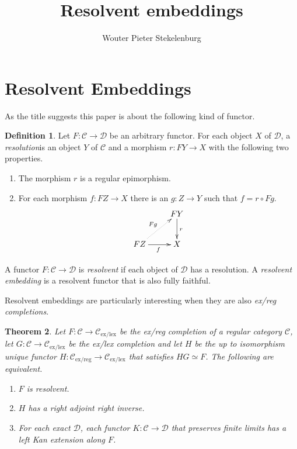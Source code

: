 \documentclass[sort&compress]{elsarticle}
\theoremstyle{plain}
\newtheorem{theorem}{Theorem}
\theoremstyle{definition}
\newtheorem{definition}[theorem]{Definition}
\theoremstyle{remark}
\newcommand\hide[1]{}
\newcommand\key[1]{\emph{#1}\label{#1}}
\newcommand\cat\mathcal
\newcommand\exlex{_\mathrm{ex/lex}}\newcommand\exreg{_\mathrm{ex/reg}}
\newcommand\of:
\begin{document}
\begin{frontmatter}
\title{Resolvent embeddings}

\author[W. P. Stekelenburg]{Wouter Pieter Stekelenburg}
\address{Faculty of Mathematics, Informatics and Mechanics,
University of Warsaw,
Banacha 2,
02-097 Warszawa,
Poland}

\begin{abstract}
\end{abstract}

\begin{keyword}
\end{keyword}


\end{frontmatter}


\section{Resolvent Embeddings}
As the title suggests this paper is about the following kind of functor.

\begin{definition} Let $F\of \cat C\to\cat D$ be an arbitrary functor. For each object $X$ of $\cat D$, a \key{resolution} is an object $Y$ of $\cat C$ and a morphism $r\of FY \to X$ with the following two properties.
\begin{enumerate} 
\item The morphism $r$ is a regular epimorphism.
\item For each morphism $f\of FZ\to X$ there is an $g\of Z\to Y$ such that $f=r\circ Fg$. 
\[ \xymatrix{
& FY \ar[d]^{r} \\
FZ\ar[r]_f \ar@{.>}[ur]^{Fg} & X
}\]
\end{enumerate}
A functor $F:\cat C\to\cat D$ is \key{resolvent} if each object of $\cat D$ has a resolution. A \emph{resolvent embedding} is a resolvent functor that is also fully faithful.
\end{definition}

Resolvent embeddings are particularly interesting when they are also \emph{ex/reg completions}.\hide{Clarify that we are talking about the functors and why.}

\begin{theorem} Let $F:\cat C\to\cat C\exlex$ be the ex/reg completion of a regular category $\cat C$, let $G\of \cat C \to \cat C\exlex$ be the ex/lex completion and let $H$ be the up to isomorphism unique functor $H\of\cat C\exreg \to \cat C\exlex$ that satisfies $HG\simeq F$. 
The following are equivalent.
\begin{enumerate}
\item $F$ is resolvent.
\item $H$ has a right adjoint right inverse.
\item For each exact $\cat D$, each functor $K\of \cat C \to \cat D$ that preserves finite limits has a left Kan extension along $F$.
\end{enumerate}
\end{theorem}
\end{document}
